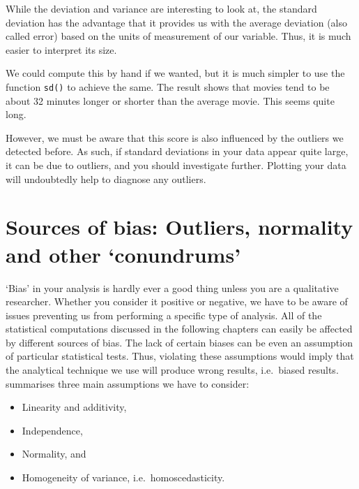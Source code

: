 \documentclass[
]{book}
\newenvironment{Shaded}{\begin{snugshade}}{\end{snugshade}}
\newcommand{\DocumentationTok}[1]{\textcolor[rgb]{0.56,0.35,0.01}{\textbf{\textit{#1}}}}
\newcommand{\FunctionTok}[1]{\textcolor[rgb]{0.00,0.00,0.00}{#1}}
\newcommand{\NormalTok}[1]{#1}
\newcommand{\SpecialCharTok}[1]{\textcolor[rgb]{0.00,0.00,0.00}{#1}}
\begin{document}
While the deviation and variance are interesting to look at, the standard deviation has the advantage that it provides us with the average deviation (also called error) based on the units of measurement of our variable. Thus, it is much easier to interpret its size.

We could compute this by hand if we wanted, but it is much simpler to use the function \texttt{sd()} to achieve the same. The result shows that movies tend to be about 32 minutes longer or shorter than the average movie. This seems quite long.

\begin{Shaded}
\end{Shaded}

However, we must be aware that this score is also influenced by the outliers we detected before. As such, if standard deviations in your data appear quite large, it can be due to outliers, and you should investigate further. Plotting your data will undoubtedly help to diagnose any outliers.

\hypertarget{sources-of-bias}{%
\chapter{Sources of bias: Outliers, normality and other `conundrums'}\label{sources-of-bias}}

`Bias' in your analysis is hardly ever a good thing unless you are a qualitative researcher. Whether you consider it positive or negative, we have to be aware of issues preventing us from performing a specific type of analysis. All of the statistical computations discussed in the following chapters can easily be affected by different sources of bias. The lack of certain biases can be even an assumption of particular statistical tests. Thus, violating these assumptions would imply that the analytical technique we use will produce wrong results, i.e.~biased results. \citet{field2013discovering} summarises three main assumptions we have to consider:

\begin{itemize}
\item
  Linearity and additivity,
\item
  Independence,
\item
  Normality, and
\item
  Homogeneity of variance, i.e.~homoscedasticity.
\end{itemize}
\end{document}
